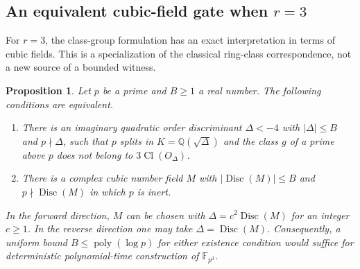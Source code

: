 \documentclass[11pt]{article}
\newtheorem{proposition}[theorem]{Proposition}
\theoremstyle{definition}
\theoremstyle{remark}
\begin{document}
\subsection{An equivalent cubic-field gate when \texorpdfstring{$r=3$}{r=3}}

For $r=3$, the class-group formulation has an exact interpretation
in terms of cubic fields.  This is a specialization of the classical
ring-class correspondence, not a new source of a bounded witness.

\begin{proposition}\label{prop:cubic-cm-equivalent-gate}
Let $p$ be a prime and $B\ge1$ a real number.  The following
conditions are equivalent.
\begin{enumerate}
\item There is an imaginary quadratic order discriminant
      $\Delta<-4$ with $|\Delta|\le B$ and $p\nmid\Delta$, such
      that $p$ splits in $K=\mathbb Q(\sqrt\Delta)$ and the class
      $g$ of a prime above $p$ does not belong to
      $3\operatorname{Cl}(O_\Delta)$.
\item There is a complex cubic number field $M$ with
      $|\operatorname{Disc}(M)|\le B$ and
      $p\nmid\operatorname{Disc}(M)$ in which $p$ is inert.
\end{enumerate}
In the forward direction, $M$ can be chosen with
$\Delta=c^2\operatorname{Disc}(M)$ for an integer $c\ge1$.
In the reverse direction one may take
$\Delta=\operatorname{Disc}(M)$.
Consequently, a uniform bound $B\le\operatorname{poly}(\log p)$
for either existence condition would suffice for deterministic
polynomial-time construction of $\mathbb F_{p^3}$.
\end{proposition}
\end{document}
